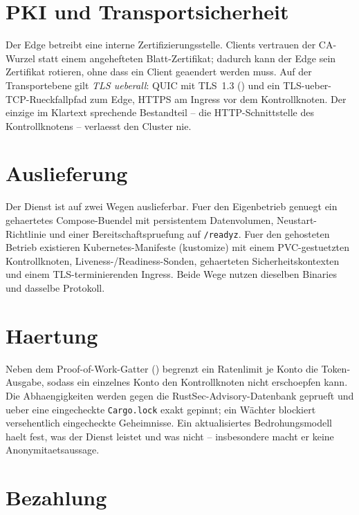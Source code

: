 \section{PKI und Transportsicherheit}
\label{sec:prod-pki}

Der Edge betreibt eine interne Zertifizierungsstelle. Clients vertrauen der
CA-Wurzel statt einem angehefteten Blatt-Zertifikat; dadurch kann der Edge
sein Zertifikat rotieren, ohne dass ein Client geaendert werden muss. Auf der
Transportebene gilt \emph{TLS ueberall}: QUIC mit TLS~1.3
(\cite{rfc9001,rfc8446}) und ein TLS-ueber-TCP-Rueckfallpfad zum Edge, HTTPS
am Ingress vor dem Kontrollknoten. Der einzige im Klartext sprechende
Bestandteil -- die HTTP-Schnittstelle des Kontrollknotens -- verlaesst den
Cluster nie.

\section{Auslieferung}
\label{sec:prod-deploy}

Der Dienst ist auf zwei Wegen auslieferbar. Fuer den Eigenbetrieb genuegt ein
gehaertetes Compose-Buendel mit persistentem Datenvolumen, Neustart-Richtlinie
und einer Bereitschaftspruefung auf \texttt{/readyz}. Fuer den gehosteten
Betrieb existieren Kubernetes-Manifeste (kustomize) mit einem PVC-gestuetzten
Kontrollknoten, Liveness-/Readiness-Sonden, gehaerteten Sicherheitskontexten
und einem TLS-terminierenden Ingress. Beide Wege nutzen dieselben Binaries und
dasselbe Protokoll.

\section{Haertung}
\label{sec:prod-haertung}

Neben dem Proof-of-Work-Gatter (\cite{back2002hashcash}) begrenzt ein
Ratenlimit je Konto die Token-Ausgabe, sodass ein einzelnes Konto den
Kontrollknoten nicht erschoepfen kann. Die Abhaengigkeiten werden gegen die
RustSec-Advisory-Datenbank geprueft und ueber eine eingecheckte
\texttt{Cargo.lock} exakt gepinnt; ein Wächter blockiert versehentlich
eingecheckte Geheimnisse. Ein aktualisiertes Bedrohungsmodell haelt fest, was
der Dienst leistet und was nicht -- insbesondere macht er keine
Anonymitaetsaussage.

\section{Bezahlung}
\label{sec:prod-payment}

